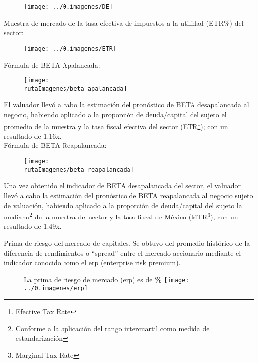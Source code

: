 \begin{figure}[H]
\centering
\texttt{[image: ../0.imagenes/DE]}
\end{figure}

\textcolor{principal}{Muestra de mercado de la tasa efectiva de impuestos a la utilidad (ETR\%) del sector:}

\begin{figure}[H]
\centering
\texttt{[image: ../0.imagenes/ETR]}
\end{figure}

F\'ormula de BETA Apalancada:
\begin{figure}[H]
\centering
\texttt{[image: \\rutaImagenes/beta\_apalancada]}
\end{figure}

El valuador llev\'o a cabo la estimaci\'on del pron\'ostico de BETA desapalancada al negocio, habiendo aplicado a la proporci\'on de deuda/capital del sujeto el promedio de la muestra y la tasa fiscal efectiva del sector (ETR\footnote{Efective Tax Rate}); con un resultado de 1.16x.\\

F\'ormula de BETA Reapalancada:\\

\begin{figure}[H]
\centering
\texttt{[image: \\rutaImagenes/beta\_reapalancada]}
\end{figure}

Una vez obtenido el indicador de BETA desapalancada del sector, el valuador llev\'o a cabo la estimaci\'on del pron\'ostico de BETA reapalancada al negocio sujeto de valuaci\'on, habiendo aplicado a la proporci\'on de deuda/capital del sujeto la mediana\footnote{Conforme a la aplicaci\'on del rango intercuartil como medida de estandarizaci\'on}  de la muestra del sector y la tasa fiscal de M\'exico (MTR\footnote{Marginal Tax Rate}), con un resultado de 1.49x.\\

\newpage



\textcolor{principal}{Prima de riesgo del mercado de capitales}. Se obtuvo del promedio hist\'orico de la diferencia de rendimientos o ``spread'' entre el mercado accionario \mercadoAccionario mediante el indicador conocido como el \gls{erp} (enterprise risk premium).\\

\begin{figure}[H]
\centering
La prima de riesgo de mercado (\gls{erp}) es de \textbf{\textcolor{principal}{\erpValor\%}} \texttt{[image: ../0.imagenes/erp]}
\end{figure}

